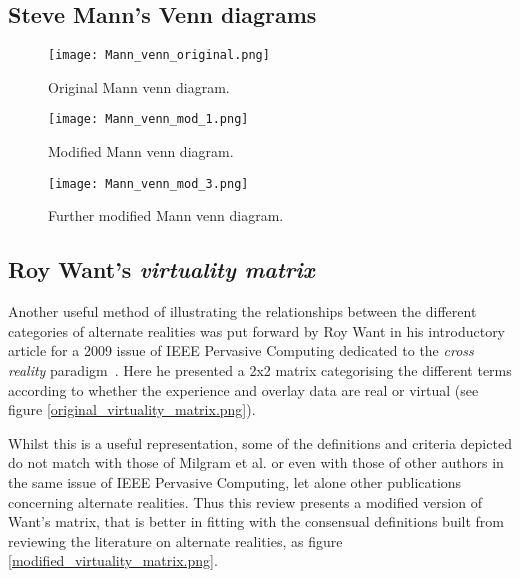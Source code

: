 
\subsection{Steve Mann's Venn diagrams}

\begin{figure}[h]
\centering
\begin{minipage}{.5\textwidth}
  \centering
  \texttt{[image: Mann\_venn\_original.png]}
  \caption{Original Mann venn diagram.}
\end{minipage}%
\begin{minipage}{.5\textwidth}
  \centering
  \texttt{[image: Mann\_venn\_mod\_1.png]}
    \caption{Modified Mann venn diagram.}
\end{minipage}
\end{figure}

\begin{figure}[h]
\centering
  \texttt{[image: Mann\_venn\_mod\_3.png]}
  \caption{Further modified Mann venn diagram.}
\end{figure}


\clearpage

\subsection{Roy Want's \textit{virtuality matrix}}

Another useful method of illustrating the relationships between the different categories of alternate realities was put forward by Roy Want in his introductory article for a 2009 issue of IEEE Pervasive Computing dedicated to the \textit{cross reality} paradigm~\cite{Want2009}. Here he presented a 2x2 matrix categorising the different terms according to whether the experience and overlay data are real or virtual (see figure \ref{original_virtuality_matrix.png}).

Whilst this is a useful representation, some of the definitions and criteria depicted do not match with those of Milgram et al. or even with those of other authors in the same issue of IEEE Pervasive Computing, let alone other publications concerning alternate realities. Thus this review presents a modified version of Want's matrix, that is better in fitting with the consensual definitions built from reviewing the literature on alternate realities, as figure \ref{modified_virtuality_matrix.png}.

